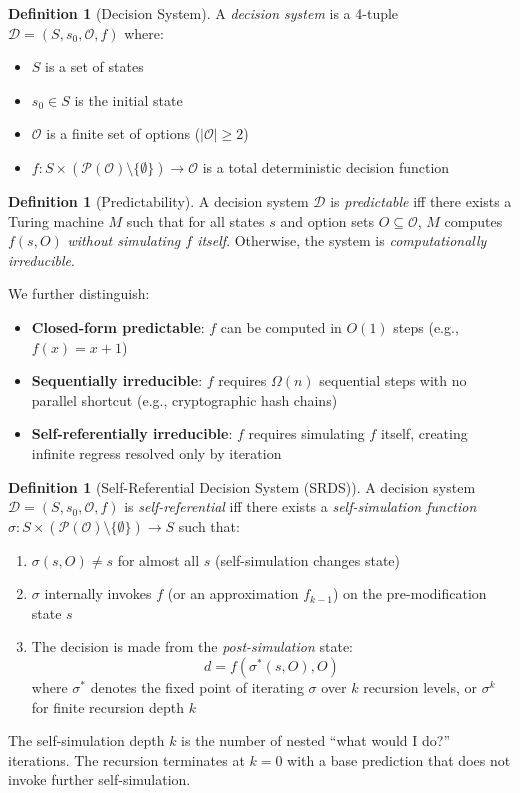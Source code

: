 \documentclass[12pt,a4paper]{article}
\theoremstyle{definition}
\newtheorem{definition}[theorem]{Definition}
\theoremstyle{remark}
\newcommand{\cO}{\mathcal{O}}
\newcommand{\cD}{\mathcal{D}}
\begin{document}
\begin{definition}[Decision System]
A \emph{decision system} is a 4-tuple $\cD = (S, s_0, \cO, f)$ where:
\begin{itemize}[itemsep=0pt]
\item $S$ is a set of states
\item $s_0 \in S$ is the initial state
\item $\cO$ is a finite set of options ($|\cO| \geq 2$)
\item $f: S \times (\mathcal{P}(\cO) \setminus \{\emptyset\}) \to \cO$
  is a total deterministic decision function
\end{itemize}
\end{definition}

\begin{definition}[Predictability]
A decision system $\cD$ is \emph{predictable} iff there exists a Turing machine
$M$ such that for all states $s$ and option sets $O \subseteq \cO$, $M$ computes
$f(s, O)$ \emph{without simulating $f$ itself}. Otherwise, the system is
\emph{computationally irreducible}.

We further distinguish:
\begin{itemize}[itemsep=0pt]
\item \textbf{Closed-form predictable}: $f$ can be computed in $O(1)$ steps
  (e.g., $f(x) = x+1$)
\item \textbf{Sequentially irreducible}: $f$ requires $\Omega(n)$ sequential
  steps with no parallel shortcut (e.g., cryptographic hash chains)
\item \textbf{Self-referentially irreducible}: $f$ requires simulating $f$
  itself, creating infinite regress resolved only by iteration
\end{itemize}
\end{definition}

\begin{definition}[Self-Referential Decision System (SRDS)]
A decision system $\cD = (S, s_0, \cO, f)$ is \emph{self-referential} iff
there exists a \emph{self-simulation function}
$\sigma: S \times (\mathcal{P}(\cO) \setminus \{\emptyset\}) \to S$
such that:

\begin{enumerate}[label=(\roman*), itemsep=0pt]
\item $\sigma(s, O) \neq s$ for almost all $s$ (self-simulation changes state)
\item $\sigma$ internally invokes $f$ (or an approximation $f_{k-1}$) on the
  pre-modification state $s$
\item The decision is made from the \emph{post-simulation} state:
  \begin{equation}
  d = f(\sigma^*(s, O), O)
  \end{equation}
  where $\sigma^*$ denotes the fixed point of iterating $\sigma$ over $k$
  recursion levels, or $\sigma^k$ for finite recursion depth $k$
\end{enumerate}

The self-simulation depth $k$ is the number of nested ``what would I do?''
iterations. The recursion terminates at $k=0$ with a base prediction that
does not invoke further self-simulation.
\end{definition}
\end{document}
